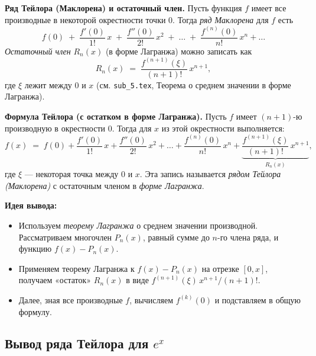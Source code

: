 

\textbf{Ряд Тейлора (Маклорена) и остаточный член.}
Пусть функция $f$ имеет все производные в некоторой окрестности точки $0$. Тогда \emph{ряд Маклорена} для $f$ есть
\[
f(0) \;+\; \frac{f'(0)}{1!}\,x \;+\; \frac{f''(0)}{2!}\,x^2 \;+\; \dots \;+\; \frac{f^{(n)}(0)}{n!}\,x^n + \dots
\]
\emph{Остаточный член} $R_n(x)$ (в форме Лагранжа) можно записать как
\[
R_n(x) \;=\; \frac{f^{(n+1)}(\xi)}{(n+1)!}\,x^{n+1},
\]
где $\xi$ лежит между $0$ и $x$ (см. \texttt{sub\_5.tex}, Теорема о среднем значении в форме Лагранжа).

\medskip


\textbf{Формула Тейлора (с остатком в форме Лагранжа).}
Пусть $f$ имеет $(n+1)$-ю производную в окрестности $0$. Тогда для $x$ из этой окрестности выполняется:
\[
f(x) \;=\;
f(0) + \frac{f'(0)}{1!}\,x + \frac{f''(0)}{2!}\,x^2 + \dots + \frac{f^{(n)}(0)}{n!}\,x^n + \underbrace{\frac{f^{(n+1)}(\xi)}{(n+1)!}\,x^{n+1}}_{R_{n}(x)},
\]
где $\xi$ — некоторая точка между $0$ и $x$. Эта запись называется \emph{рядом Тейлора (Маклорена)} с остаточным членом в \emph{форме Лагранжа}.

\medskip


\textbf{Идея вывода:}
\begin{itemize}
  \item Используем \emph{теорему Лагранжа} о среднем значении производной. Рассматриваем многочлен $P_n(x)$, равный сумме до $n$-го члена ряда, и функцию $f(x)-P_n(x)$.  
  \item Применяем теорему Лагранжа к $f(x)-P_n(x)$ на отрезке $[0,x]$, получаем «остаток» $R_n(x)$ в виде $f^{(n+1)}(\xi)\, x^{n+1}/(n+1)!$.  
  \item Далее, зная все производные $f$, вычисляем $f^{(k)}(0)$ и подставляем в общую формулу.
\end{itemize}

\medskip


\subsection*{Вывод ряда Тейлора для $e^x$}


